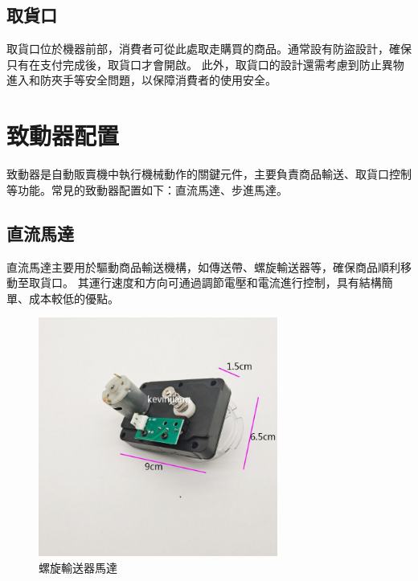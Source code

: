 \documentclass[12pt]{article}       %
\begin{document}
\subsection{取貨口} 
\hspace{2em}
取貨口位於機器前部，消費者可從此處取走購買的商品。通常設有防盜設計，確保只有在支付完成後，取貨口才會開啟。
此外，取貨口的設計還需考慮到防止異物進入和防夾手等安全問題，以保障消費者的使用安全。

\section{\centering 致動器配置}
\hspace{2em}
致動器是自動販賣機中執行機械動作的關鍵元件，主要負責商品輸送、取貨口控制等功能。常見的致動器配置如下：直流馬達、步進馬達。

\subsection{直流馬達} 
\hspace{2em}
直流馬達主要用於驅動商品輸送機構，如傳送帶、螺旋輸送器等，確保商品順利移動至取貨口。
其運行速度和方向可通過調節電壓和電流進行控制，具有結構簡單、成本較低的優點。
\begin{figure}[H]
    \centering
    \includegraphics[width=0.7\textwidth]{796df6466ae469d808895d21ce938327.jpg}     %
    \caption{螺旋輸送器馬達\cite{lazada_vending_machine_2025}}    %
    \label{fig:example5}    %
\end{figure} 
\end{document}
